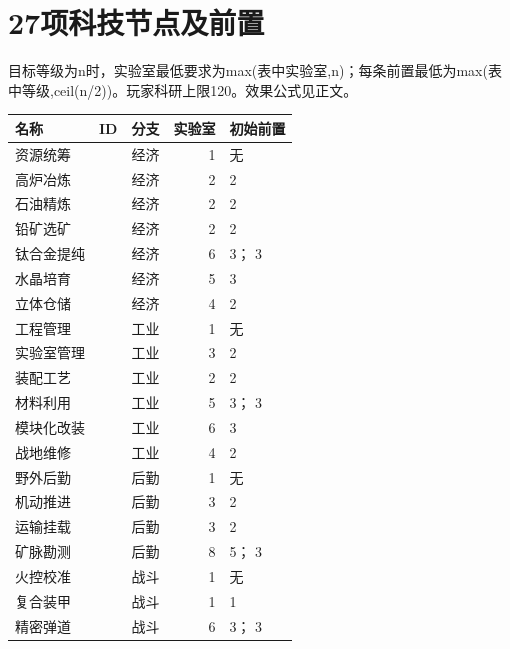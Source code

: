 \section{27项科技节点及前置}
目标等级为n时，实验室最低要求为max(表中实验室,n)；每条前置最低为max(表中等级,ceil(n/2))。玩家科研上限120。效果公式见正文。
\begin{small}
\begin{longtable}{@{}P{24mm}P{30mm}P{18mm}rP{50mm}@{}}
\toprule 名称 & ID & 分支 & 实验室 & 初始前置 \\
\midrule\endhead
资源统筹 &  & 经济 & 1 & 无 \\
高炉冶炼 &  & 经济 & 2 &  2 \\
石油精炼 &  & 经济 & 2 &  2 \\
铅矿选矿 &  & 经济 & 2 &  2 \\
钛合金提纯 &  & 经济 & 6 &  3； 3 \\
水晶培育 &  & 经济 & 5 &  3 \\
立体仓储 &  & 经济 & 4 &  2 \\
工程管理 &  & 工业 & 1 & 无 \\
实验室管理 &  & 工业 & 3 &  2 \\
装配工艺 &  & 工业 & 2 &  2 \\
材料利用 &  & 工业 & 5 &  3； 3 \\
模块化改装 &  & 工业 & 6 &  3 \\
战地维修 &  & 工业 & 4 &  2 \\
野外后勤 &  & 后勤 & 1 & 无 \\
机动推进 &  & 后勤 & 3 &  2 \\
运输挂载 &  & 后勤 & 3 &  2 \\
矿脉勘测 &  & 后勤 & 8 &  5； 3 \\
火控校准 &  & 战斗 & 1 & 无 \\
复合装甲 &  & 战斗 & 1 &  1 \\
精密弹道 &  & 战斗 & 6 &  3； 3 \\

\end{longtable}
\end{small}

